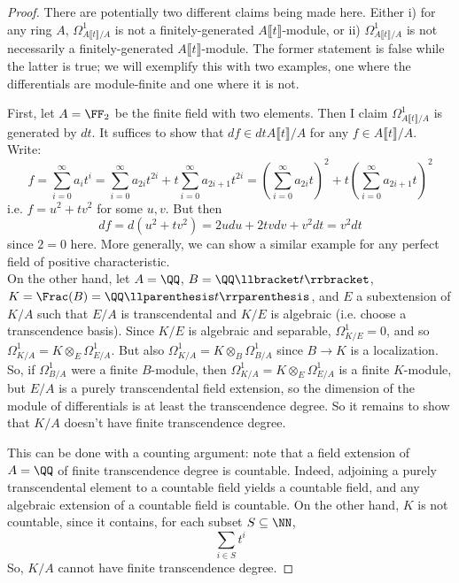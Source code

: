 \begin{proof}
	There are potentially two different claims being made here. Either i) for any ring $A$, $\Omega^1_{A \llbracket t \rrbracket/A}$ is not a finitely-generated $A \llbracket t \rrbracket$-module, or ii) $\Omega^1_{A \llbracket t \rrbracket/A}$ is not necessarily a finitely-generated $A \llbracket t \rrbracket$-module. The former statement is false while the latter is true; we will exemplify this with two examples, one where the differentials are module-finite and one where it is not.
	
	First, let $A = \FF_2$ be the finite field with two elements. Then I claim $\Omega^1_{A \llbracket t \rrbracket/A}$ is generated by $dt$. It suffices to show that $df \in dtA \llbracket t \rrbracket/A$ for any $f \in A \llbracket t \rrbracket/A$. Write:
	\[ f = \sum_{i=0}^\infty a_it^i = \sum_{i=0}^\infty a_{2i}t^{2i} + t\sum_{i=0}^\infty a_{2i+1}t^{2i} = \left(\sum_{i=0}^\infty a_{2i}t\right)^2 + t\left(\sum_{i=0}^\infty a_{2i+1}t\right)^2 \]
	i.e. $f = u^2 + tv^2$ for some $u,v$. But then
	\[ df = d(u^2+tv^2) = 2udu + 2tvdv + v^2dt = v^2dt \]
	since $2=0$ here. More generally, we can show a similar example for any perfect field of positive characteristic. \\
	
	On the other hand, let $A = \QQ$, $B = \QQ \llbracket t \rrbracket$, $K = \Frac(B) = \QQ \llparenthesis t \rrparenthesis$, and $E$ a subextension of $K/A$ such that $E/A$ is transcendental and $K/E$ is algebraic (i.e. choose a transcendence basis). Since $K/E$ is algebraic and separable, $\Omega^1_{K/E} = 0$, and so $\Omega^1_{K/A} = K \otimes_E \Omega^1_{E/A}$. But also $\Omega^1_{K/A} = K \otimes_B \Omega^1_{B/A}$ since $B \to K$ is a localization. So, if $\Omega^1_{B/A}$ were a finite $B$-module, then $\Omega^1_{K/A} = K \otimes_E \Omega^1_{E/A}$ is a finite $K$-module, but $E/A$ is a purely transcendental field extension, so the dimension of the module of differentials is at least the transcendence degree. So it remains to show that $K/A$ doesn't have finite transcendence degree.
	
	This can be done with a counting argument: note that a field extension of $A = \QQ$ of finite transcendence degree is countable. Indeed, adjoining a purely transcendental element to a countable field yields a countable field, and any algebraic extension of a countable field is countable. On the other hand, $K$ is not countable, since it contains, for each subset $S \subseteq \NN$,
	\[ \sum_{i \in S} t^i \]
	So, $K/A$ cannot have finite transcendence degree.
\end{proof}
